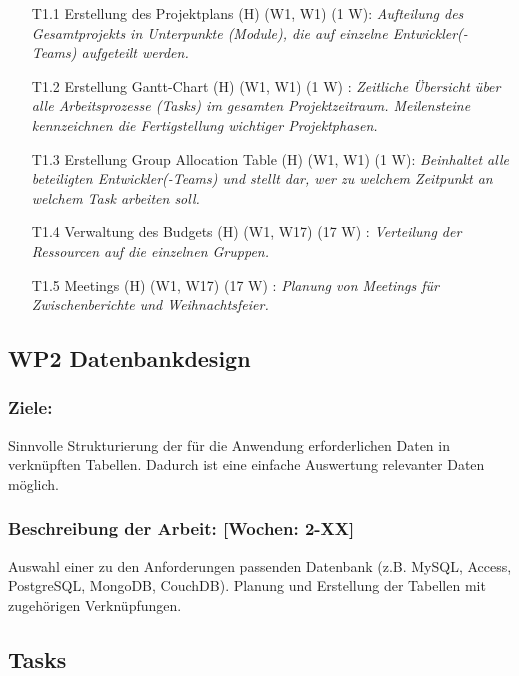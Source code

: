 \documentclass{scrreprt}
\begin{document}
\begin{enumerate}
\item [T1.1] Erstellung des Projektplans (H) (W1, W1) (1 W): \emph{ Aufteilung des Gesamtprojekts in Unterpunkte (Module), die auf einzelne Entwickler(-Teams) aufgeteilt werden.}
\item [T1.2] Erstellung Gantt-Chart (H) (W1, W1) (1 W) : \emph{ Zeitliche Übersicht über alle Arbeitsprozesse (Tasks) im gesamten Projektzeitraum. Meilensteine kennzeichnen die Fertigstellung wichtiger Projektphasen.}
\item [T1.3] Erstellung Group Allocation Table (H) (W1, W1) (1 W): \emph{ Beinhaltet alle beteiligten Entwickler(-Teams) und stellt dar, wer zu welchem Zeitpunkt an welchem Task arbeiten soll.}
\item [T1.4] Verwaltung des Budgets (H) (W1, W17) (17 W) : \emph{Verteilung der Ressourcen auf die einzelnen Gruppen.}
\item [T1.5] Meetings (H) (W1, W17) (17 W) : \emph{Planung von Meetings für Zwischenberichte und Weihnachtsfeier.}
\end{enumerate}

\subsection*{WP2 Datenbankdesign}

\subsubsection{Ziele:} Sinnvolle Strukturierung der für die Anwendung erforderlichen Daten in verknüpften Tabellen. Dadurch ist eine einfache Auswertung relevanter Daten möglich.
\subsubsection{Beschreibung der Arbeit: [Wochen: 2-XX]} Auswahl einer zu den Anforderungen passenden Datenbank (z.B. MySQL, Access, PostgreSQL, MongoDB, CouchDB). Planung und Erstellung der Tabellen mit zugehörigen Verknüpfungen.


\subsection*{Tasks}
\end{document}
